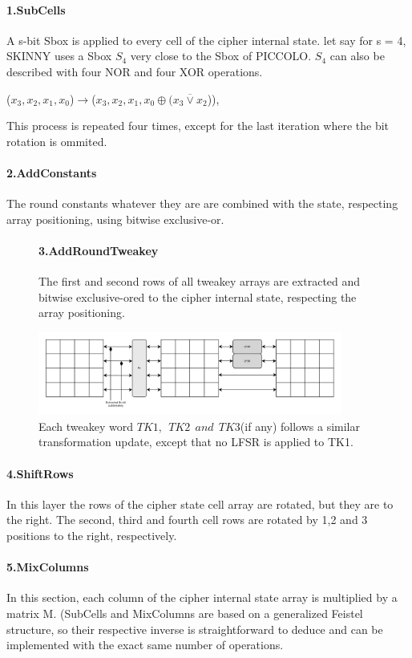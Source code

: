 \documentclass[preprint]{transcrypto}
\begin{document}
\paragraph{1.SubCells}A s-bit Sbox is applied to every cell of the cipher internal state. let say for s = 4, SKINNY uses a Sbox $S_4$ very close to the Sbox of \textmd{PICCOLO}. $S_4$ can also be described with four NOR and four XOR operations.

\begin{center}
	($x_3,x_2,x_1,x_0$)$\rightarrow$($x_3,x_2,x_1,x_0\oplus(\overline{x_3\vee x_2}$)),\\
\end{center}
This process is repeated four times, except for the last iteration where the bit rotation is ommited.
\paragraph{2.AddConstants}The round constants whatever they are are combined with the state, respecting array positioning, using bitwise exclusive-or.
\begin{figure}[H]
	\paragraph{3.AddRoundTweakey}The first and second rows of all tweakey arrays are extracted and bitwise exclusive-ored to the cipher internal state, respecting the array positioning.
\begin{center}
	\caption{Each tweakey word $TK1,\ \ TK2\ \ and\ \ TK3$(if any) follows a similar transformation update, except that no LFSR is applied to TK1.}
	\includegraphics[width=10cm]{fig2.png}
\end{center}
\end{figure}
\paragraph{4.ShiftRows}In this layer the rows of the cipher state cell array are rotated, but they are to the right. The second, third and fourth cell rows are rotated by 1,2 and 3 positions to the right, respectively.
\paragraph{5.MixColumns}In this section, each column of the cipher internal state array is multiplied by a matrix M. (SubCells and MixColumns are based on a generalized Feistel structure, so their respective inverse is straightforward to deduce and can be implemented with the exact same number of operations.
\end{document}
